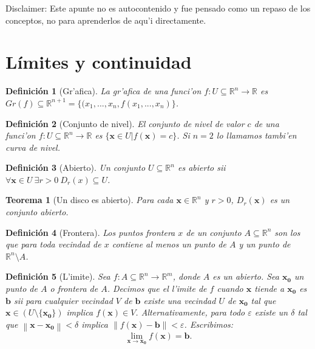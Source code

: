 \documentclass[a4paper,spanish]{article}
\newcommand{\R}[0]{\mathbb{R}}
\newcommand{\norma}[1]{\left\|#1\right\|}
\newcommand{\limite}[2]{\lim_{ #1 \rightarrow #2}}
\newcommand{\xx}[0]{\mathbf{x}}
\newcommand{\xO}[0]{\mathbf{x_0}}
\newcommand{\eps}[0]{\varepsilon}
\newtheorem{teo}{Teorema}
\newtheorem{defi}{Definici\'on}
\begin{document}
Disclaimer: Este apunte no es autocontenido y fue pensado como un repaso 
de los conceptos, no para aprenderlos de aqu'i directamente.

\section{L\'imites y continuidad}

\begin{defi}[Gr'afica]
\label{def-grafica}
La \emph{gr'afica} de una funci'on $f: U \subseteq \R^n \to \R$ es 
$Gr(f) \subseteq \R^{n+1} = \{(x_1,...,x_n,f(x_1,...,x_n)\}$.
\end{defi}

\begin{defi}[Conjunto de nivel]
\label{def-conj-nivel}
El \emph{conjunto de nivel} de valor $c$ de una funci'on 
$f: U \subseteq \R^n \to \R$ es $\{\xx \in U | f(\xx) = c\}$.
Si $n = 2$ lo llamamos tambi'en \emph{curva de nivel}.
\end{defi}

\begin{defi}[Abierto]
\label{def-abierto}
Un conjunto $U \subseteq \R^n$ es \emph{abierto} sii $\forall \xx \in U
\ \exists r > 0\ D_r(x) \subseteq U$.
\end{defi}

\begin{teo}[Un disco es abierto]
\label{teo-D-abierto}
Para cada $\xx \in \R^n$ y $r > 0$, $D_r(\xx)$ es un conjunto 
abierto.
\end{teo}

\begin{defi}[Frontera]
\label{def-frontera}
Los \emph{puntos frontera} $x$ de un conjunto $A \subseteq \R^n$ son los que
para toda vecindad de $x$ contiene al menos un punto de $A$ y un punto de 
$\R^n \setminus A$.
\end{defi}

\begin{defi}[L'imite]
\label{def-limite}
Sea $f : A \subseteq \R^n \to \R^m$, donde $A$ es un abierto. Sea
$\xO$ un punto de $A$ o frontera de $A$. Decimos que el \emph{l'imite}
de $f$ cuando $\xx$ tiende a $\xO$ es $\mathbf{b}$ sii para 
cualquier vecindad $V$ de $\mathbf{b}$ existe una vecindad $U$ de
$\xO$ tal que $\xx \in (U \setminus \{\xO\})$ implica $f(\xx) \in V$.
Alternativamente, para todo $\eps$ existe un $\delta$ tal que 
$\norma{\xx - \xO} < \delta$ implica 
$\norma{f(\xx) - \mathbf{b}} < \eps$. Escribimos:
$$\limite{\xx}{\xO} f(\xx) = \mathbf{b}.$$
\end{defi}
\end{document}
